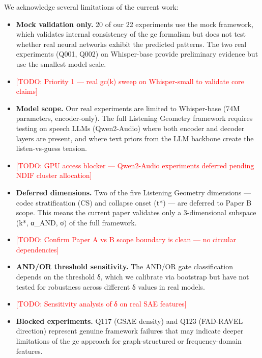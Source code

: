 \documentclass[a4paper]{article}
\begin{document}
{{We acknowledge several limitations of the current work:

\begin{itemize}
\item \textbf{Mock validation only.} 20 of our 22 experiments use the mock framework, which validates internal consistency of the gc formalism but does not test whether real neural networks exhibit the predicted patterns. The two real experiments (Q001, Q002) on Whisper-base provide preliminary evidence but use the smallest model scale.
\item \textcolor{red}{[TODO: Priority 1 — real gc(k) sweep on Whisper-small to validate core claims]}
\end{itemize}

\begin{itemize}
\item \textbf{Model scope.} Our real experiments are limited to Whisper-base (74M parameters, encoder-only). The full Listening Geometry framework requires testing on speech LLMs (Qwen2-Audio) where both encoder and decoder layers are present, and where text priors from the LLM backbone create the listen-vs-guess tension.
\item \textcolor{red}{[TODO: GPU access blocker — Qwen2-Audio experiments deferred pending NDIF cluster allocation]}
\end{itemize}

\begin{itemize}
\item \textbf{Deferred dimensions.} Two of the five Listening Geometry dimensions — codec stratification (CS) and collapse onset (t*) — are deferred to Paper B scope. This means the current paper validates only a 3-dimensional subspace (k*, α_AND, σ) of the full framework.
\item \textcolor{red}{[TODO: Confirm Paper A vs B scope boundary is clean — no circular dependencies]}
\end{itemize}

\begin{itemize}
\item \textbf{AND/OR threshold sensitivity.} The AND/OR gate classification depends on the threshold δ, which we calibrate via bootstrap but have not tested for robustness across different δ values in real models.
\item \textcolor{red}{[TODO: Sensitivity analysis of δ on real SAE features]}
\end{itemize}

\begin{itemize}
\item \textbf{Blocked experiments.} Q117 (GSAE density) and Q123 (FAD-RAVEL direction) represent genuine framework failures that may indicate deeper limitations of the gc approach for graph-structured or frequency-domain features.
\end{itemize}


}}
\end{document}
